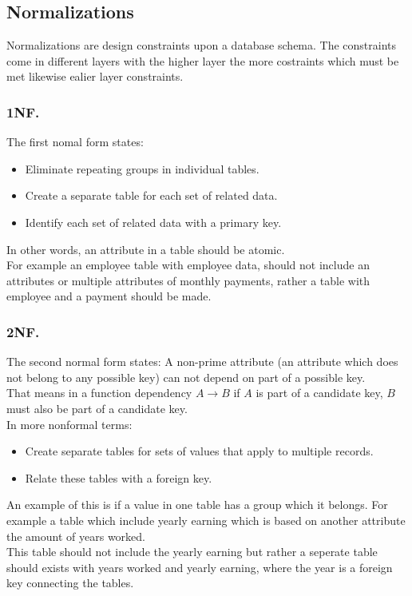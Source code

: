 \documentclass[12pt, a4paper]{article}
\begin{document}
		\subsection{Normalizations}
			Normalizations are design constraints upon a database schema. The constraints come in different layers with the higher layer the more costraints which must be met likewise ealier layer constraints.
			\subsubsection{1NF.}
				The first nomal form states:
				\begin{itemize}
					\item Eliminate repeating groups in individual tables.
					\item Create a separate table for each set of related data.
					\item Identify each set of related data with a primary key.
				\end{itemize}
				In other words, an attribute in a table should be atomic.\\
				For example an employee table with employee data, should not include an attributes or multiple attributes of monthly payments, rather a table with employee and a payment should be made.
			\subsubsection{2NF.}
				The second normal form states: A non-prime attribute (an attribute which does not belong to any possible key) can not depend on part of a possible key.\\
				That means in a function dependency $A\rightarrow B$ if $A$ is part of a candidate key, $B$ must also be part of a candidate key.\\
				In more nonformal terms:
				\begin{itemize}
					\item Create separate tables for sets of values that apply to multiple records.
  					\item  Relate these tables with a foreign key.
				\end{itemize}
				An example of this is if a value in one table has a group which it belongs. For example a table which include yearly earning which is based on another attribute the amount of years worked.\\
				This table should not include the yearly earning but rather a seperate table should exists with years worked and yearly earning, where the year is a foreign key connecting the tables.
\end{document}
